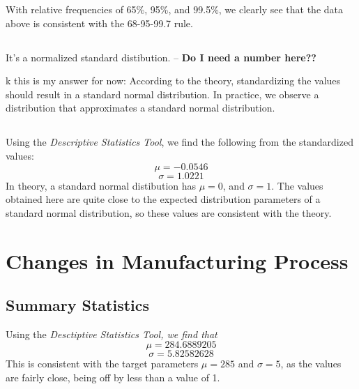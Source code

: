 \documentclass[letterpaper]{article}
\begin{document}
With relative frequencies of 65\%, 95\%, and 99.5\%, we clearly see that the
data above is consistent with the 68-95-99.7 rule.

\subsection{} %
It's a normalized standard distibution. -- \textbf{Do I need a number here??}

k this is my answer for now:
According to the theory, standardizing the values should result in a standard normal distribution.
In practice, we observe a distribution that approximates a standard normal distribution.

\subsection{} %
Using the \textit{Descriptive Statistics Tool}, we find the following from the standardized values:
$$\mu = -0.0546$$
$$\sigma = 1.0221$$
In theory, a standard normal distibution has $\mu=0$, and $\sigma=1$. The values
obtained here are quite close to the expected distribution parameters of a
standard normal distribution, so these values are consistent with the theory.

\section{Changes in Manufacturing Process}%

\subsection{Summary Statistics} %
Using the \textit{Desctiptive Statistics Tool, we find that}
$$\mu = 284.6889205$$
$$\sigma = 5.82582628$$
This is consistent with the target parameters $\mu=285$ and $\sigma=5$,
as the values are fairly close, being off by less than a value of 1.
\end{document}
